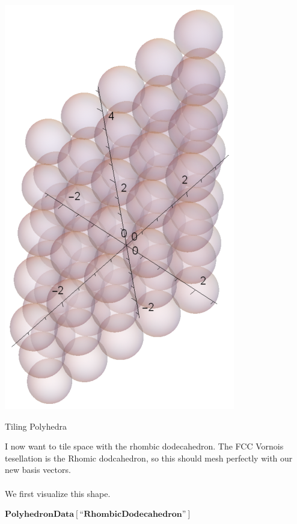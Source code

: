 \documentclass{article}
\begin{document}
\includegraphics{3D_tiling_gr4.eps}

Tiling Polyhedra

I now want to tile space with the rhombic dodecahedron. The FCC Vornois tesellation is the Rhomic dodcahedron, so this should mesh perfectly with
our new basis vectors.\\
\\
We first visualize this shape.

\begin{doublespace}
\noindent\(\pmb{\text{PolyhedronData}[\text{{``}RhombicDodecahedron{''}}]}\)
\end{doublespace}
\end{document}
